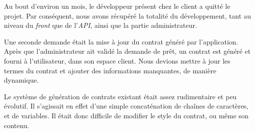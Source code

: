 Au bout d'environ un mois, le développeur présent chez le client a
quitté le projet. Par conséquent, nous avons récupéré la totalité du
développement, tant au niveau du \emph{front} que de l'\emph{API}, ainsi
que la partie administrateur.

\bigskip

Une seconde demande était la mise à jour du contrat généré par
l'application. Après que l'administrateur ait validé la demande de prêt,
un contrat est généré et fourni à l'utilisateur, dans son espace client.
Nous devions mettre à jour les termes du contrat et ajouter des
informations manquantes, de manière dynamique.

\bigskip

Le système de génération de contrats existant était assez rudimentaire
et peu évolutif. Il s'agissait en effet d'une simple concaténation de
chaînes de caractères, et de variables. Il était donc difficile de
modifier le style du contrat, ou même son contenu.

\begin{Shaded}
\begin{Highlighting}[]
 \NormalTok{() }\OperatorTok{=}  \OperatorTok{,} \OperatorTok{\{}
   \OperatorTok{=} 
\OperatorTok{;}
  \OperatorTok{+=}  \OperatorTok{+} 
\OperatorTok{;}
  \OperatorTok{+=} 
\OperatorTok{;}
  \OperatorTok{+=}  
\OperatorTok{;}
  \OperatorTok{+=}  \OperatorTok{+} \OperatorTok{;}
  \OperatorTok{+=}  \OperatorTok{+} \OperatorTok{;}
  \OperatorTok{+=}  \OperatorTok{+} 
    \OperatorTok{+}  \OperatorTok{+} 
    \OperatorTok{+}  \OperatorTok{\}}\NormalTok{\} }\OperatorTok{+} \OperatorTok{;}
\NormalTok{\}}
\end{Highlighting}
\end{Shaded}

